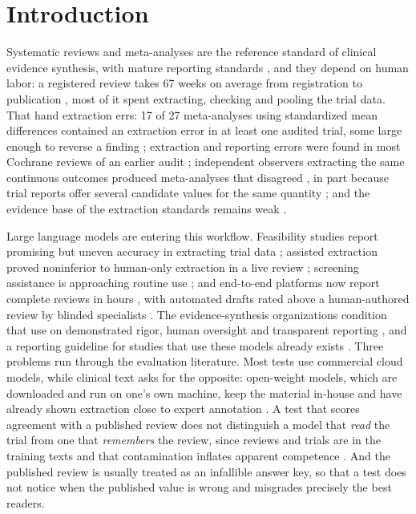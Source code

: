 \documentclass[11pt]{article}
\begin{document}
\section{Introduction}

Systematic reviews and meta-analyses are the reference standard of clinical evidence synthesis, with mature reporting standards \citep{page2021prisma}, and they depend on human labor: a registered review takes 67 weeks on average from registration to publication \citep{borah2017time}, most of it spent extracting, checking and pooling the trial data. That hand extraction errs: 17 of 27 meta-analyses using standardized mean differences contained an extraction error in at least one audited trial, some large enough to reverse a finding \citep{gotzsche2007extraction}; extraction and reporting errors were found in most Cochrane reviews of an earlier audit \citep{jones2005errors}; independent observers extracting the same continuous outcomes produced meta-analyses that disagreed \citep{tendal2009disagreements}, in part because trial reports offer several candidate values for the same quantity \citep{tendal2011multiplicity}; and the evidence base of the extraction standards remains weak \citep{mathes2017frequency}.

Large language models are entering this workflow. Feasibility studies report promising but uneven accuracy in extracting trial data \citep{schmidt2024exploring,khraisha2024gpt4,konet2024extraction}; assisted extraction proved noninferior to human-only extraction in a live review \citep{lee2026noninferiority}; screening assistance is approaching routine use \citep{xie2026screening}; and end-to-end platforms now report complete reviews in hours \citep{bakker2026minutes}, with automated drafts rated above a human-authored review by blinded specialists \citep{mclaughlin2026fully}. The evidence-synthesis organizations condition that use on demonstrated rigor, human oversight and transparent reporting \citep{flemyng2025position}, and a reporting guideline for studies that use these models already exists \citep{gallifant2025tripodllm}. Three problems run through the evaluation literature. Most tests use commercial cloud models, while clinical text asks for the opposite: open-weight models, which are downloaded and run on one's own machine, keep the material in-house and have already shown extraction close to expert annotation \citep{wiest2024privacy,spaanderman2025openweight}. A test that scores agreement with a published review does not distinguish a model that \emph{read} the trial from one that \emph{remembers} the review, since reviews and trials are in the training texts and that contamination inflates apparent competence \citep{carlini2023memorization,xu2024contamination,golchin2024timetravel}. And the published review is usually treated as an infallible answer key, so that a test does not notice when the published value is wrong and misgrades precisely the best readers.
\end{document}

